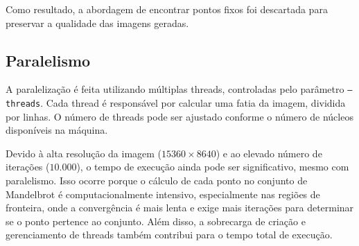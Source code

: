 Como resultado, a abordagem de encontrar pontos fixos foi descartada para preservar a qualidade das imagens geradas.
\subsection{Paralelismo}

A paralelização é feita utilizando múltiplas threads, controladas pelo parâmetro \texttt{--threads}. Cada thread é responsável por calcular uma fatia da imagem, dividida por linhas. O número de threads pode ser ajustado conforme o número de núcleos disponíveis na máquina.

Devido à alta resolução da imagem (\( 15360 \times 8640 \)) e ao elevado número de iterações (\( 10.000 \)), o tempo de execução ainda pode ser significativo, mesmo com paralelismo. Isso ocorre porque o cálculo de cada ponto no conjunto de Mandelbrot é computacionalmente intensivo, especialmente nas regiões de fronteira, onde a convergência é mais lenta e exige mais iterações para determinar se o ponto pertence ao conjunto. Além disso, a sobrecarga de criação e gerenciamento de threads também contribui para o tempo total de execução.
